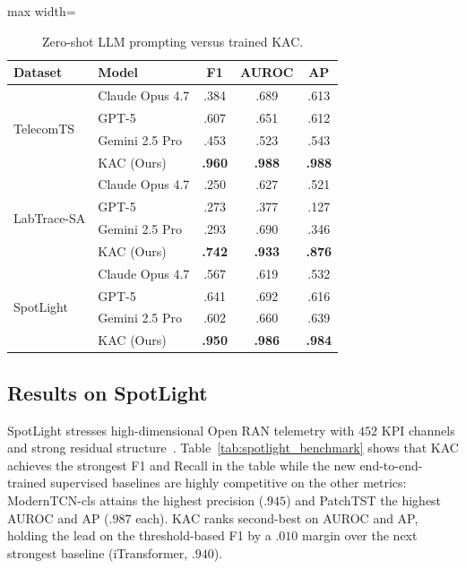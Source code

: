 \documentclass[conference]{IEEEtran}
\begin{document}
\begin{table}[t]
  \centering
  \caption{Zero-shot LLM prompting versus trained KAC.}
  \label{tab:llm_benchmark}
  \small
  \setlength{\tabcolsep}{4pt}
  \begin{adjustbox}{max width=\columnwidth}
  \begin{tabular}{@{}llccc@{}}
    \toprule
    \textbf{Dataset} & \textbf{Model} & \textbf{F1} & \textbf{AUROC} & \textbf{AP} \\
    \midrule
    \multirow{4}{*}{TelecomTS}
      & Claude Opus 4.7 & .384 & .689 & .613 \\
      & GPT-5           & .607 & .651 & .612 \\
      & Gemini 2.5 Pro  & .453 & .523 & .543 \\
      & KAC (Ours)      & \textbf{.960} & \textbf{.988} & \textbf{.988} \\
    \midrule
    \multirow{4}{*}{LabTrace-SA}
      & Claude Opus 4.7 & .250 & .627 & .521 \\
      & GPT-5           & .273 & .377 & .127 \\
      & Gemini 2.5 Pro  & .293 & .690 & .346 \\
      & KAC (Ours)      & \textbf{.742} & \textbf{.933} & \textbf{.876} \\
    \midrule
    \multirow{4}{*}{SpotLight}
      & Claude Opus 4.7 & .567 & .619 & .532 \\
      & GPT-5           & .641 & .692 & .616 \\
      & Gemini 2.5 Pro  & .602 & .660 & .639 \\
      & KAC (Ours)      & \textbf{.950} & \textbf{.986} & \textbf{.984} \\
    \bottomrule
  \end{tabular}
  \end{adjustbox}
\end{table}

\subsection{Results on SpotLight}
\label{sec:res_spotlight}

SpotLight stresses high-dimensional Open RAN telemetry with $452$ KPI channels and strong residual structure~\cite{sun2024spotlight}. Table~\ref{tab:spotlight_benchmark} shows that KAC achieves the strongest F1 and Recall in the table while the new end-to-end-trained supervised baselines are highly competitive on the other metrics: ModernTCN-cls attains the highest precision ($.945$) and PatchTST the highest AUROC and AP ($.987$ each). KAC ranks second-best on AUROC and AP, holding the lead on the threshold-based F1 by a $.010$ margin over the next strongest baseline (iTransformer, $.940$).
\end{document}
